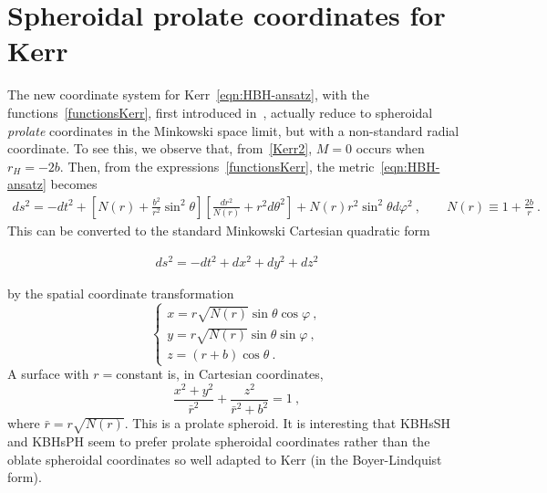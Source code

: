 \chapter{Spheroidal prolate coordinates for Kerr}
\label{prolatecoordinates}
The new coordinate system for Kerr~\eqref{eqn:HBH-ansatz}, with the functions~\eqref{functionsKerr}, first introduced in~\cite{Herdeiro:2015gia}, actually reduce to spheroidal \textit{prolate} coordinates in the Minkowski space limit, but with a non-standard radial coordinate. To see this, we observe that, from~\eqref{Kerr2}, $M=0$ occurs when $r_H=-2b$. Then, from the expressions~\eqref{functionsKerr}, the metric~\eqref{eqn:HBH-ansatz} becomes
\begin{eqnarray}
ds^2=-dt^2+\left[N(r)+\frac{b^2}{r^2}\sin^2\theta\right]\left[\frac{dr^2}{N(r)}+r^2d\theta^2\right]
+N(r)r^2\sin^2\theta d\varphi^2 \ , \qquad N(r)\equiv 1+\frac{2b}{r} \ .
\end{eqnarray}
This can be converted to the standard Minkowski Cartesian quadratic form

\begin{align}
ds^2=-dt^2+dx^2+dy^2+dz^2
\end{align}

by the spatial coordinate transformation
\begin{equation}
\left\{
\begin{array}{l}
x=r\sqrt{N(r)}\sin\theta\cos\varphi \ , \\
y=r\sqrt{N(r)}\sin\theta\sin\varphi \ , \\
z=(r+b)\cos\theta \ .
\end{array}
\right.
\end{equation}
A surface with $r=$constant is, in Cartesian coordinates,
\begin{equation}
\frac{x^2+y^2}{\bar{r}^2}+\frac{z^2}{\bar{r}^2+b^2}=1 \ ,
\end{equation}
where $\bar{r}=r\sqrt{N(r)}$. This is a prolate spheroid. It is interesting that KBHsSH and KBHsPH seem to prefer prolate spheroidal coordinates rather than the oblate spheroidal coordinates so well adapted to Kerr (in the Boyer-Lindquist form).
